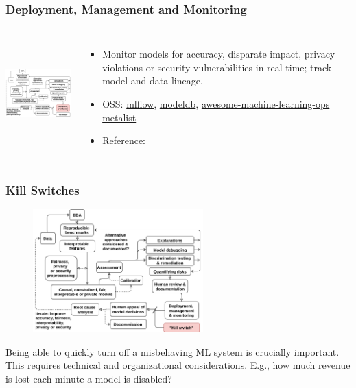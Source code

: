 \documentclass[11pt,
               aspectratio=169,
               hyperref={colorlinks}
               ]{beamer}
\begin{document}
			\begin{frame}
	
				\frametitle{Deployment, Management and Monitoring}		
				
				\begin{columns}
		
					\centering
					\includegraphics[height=120pt]{../img/deploy.png}
					
					\vspace{-5pt}
					\begin{itemize}
						\item Monitor models for accuracy, disparate impact, privacy violations or security vulnerabilities in real-time; track model and data lineage.
						\item OSS: \href{https://github.com/mlflow/mlflow}{mlflow}, \href{https://github.com/mitdbg/modeldb}{modeldb}, \href{https://github.com/EthicalML/awesome-machine-learning-operations}{awesome-machine-learning-ops metalist}
						\item Reference: 
					\end{itemize}
					
				\end{columns}
			
			\end{frame}

			\begin{frame}
	
				\frametitle{Kill Switches}	
				
				\begin{figure}[htb]
					\begin{center}
						\includegraphics[height=135pt]{../img/kill.png}
					\end{center}
				\end{figure}	
				
				\vspace{-10pt}
				\scriptsize{Being able to quickly turn off a misbehaving ML system is crucially important. This requires technical and organizational considerations. E.g., how much revenue is lost each minute a model is disabled?}	
				
				
			\end{frame}
	
\end{document}
